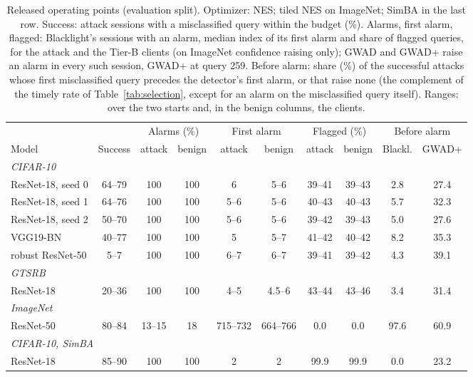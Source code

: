 \begin{table}[!tbp]
\centering\footnotesize\setlength{\tabcolsep}{2.5pt}
\caption{Released operating points (evaluation split). Optimizer: NES; tiled NES on ImageNet; SimBA in the last row. Success: attack sessions with a misclassified query within the budget (\%). Alarms, first alarm, flagged: Blacklight's sessions with an alarm, median index of its first alarm and share of flagged queries, for the attack and the Tier-B clients (on ImageNet confidence raising only); GWAD and GWAD+ raise an alarm in every such session, GWAD+ at query 259. Before alarm: share (\%) of the successful attacks whose first misclassified query precedes the detector's first alarm, or that raise none (the complement of the timely rate of Table~\ref{tab:selection}, except for an alarm on the misclassified query itself). Ranges: over the two starts and, in the benign columns, the clients.}
\label{tab:operating-main}
\vspace{3pt}
\begin{adjustbox}{max width=\textwidth}
\begin{tabular}{lccccccccc}
\toprule
& & \multicolumn{2}{c}{Alarms (\%)} & \multicolumn{2}{c}{First alarm} & \multicolumn{2}{c}{Flagged (\%)} & \multicolumn{2}{c}{Before alarm} \\
\cmidrule(lr){3-4}\cmidrule(lr){5-6}\cmidrule(lr){7-8}\cmidrule(lr){9-10}
Model & Success & attack & benign & attack & benign & attack & benign & Blackl. & GWAD+ \\
\midrule
\multicolumn{10}{l}{\emph{CIFAR-10}} \\
ResNet-18, seed 0 & 64--79 & 100 & 100 & 6 & 5--6 & 39--41 & 39--43 & 2.8 & 27.4 \\
ResNet-18, seed 1 & 64--76 & 100 & 100 & 5--6 & 5--6 & 40--43 & 40--43 & 5.7 & 32.3 \\
ResNet-18, seed 2 & 50--70 & 100 & 100 & 5--6 & 5--6 & 39--42 & 39--43 & 5.0 & 27.6 \\
VGG19-BN & 40--77 & 100 & 100 & 5 & 5--7 & 41--42 & 40--42 & 8.2 & 35.3 \\
robust ResNet-50 & 5--7 & 100 & 100 & 6--7 & 6--7 & 39--41 & 39--42 & 4.3 & 39.1 \\
\multicolumn{10}{l}{\emph{GTSRB}} \\
ResNet-18 & 20--36 & 100 & 100 & 4--5 & 4.5--6 & 43--44 & 43--46 & 3.4 & 31.4 \\
\multicolumn{10}{l}{\emph{ImageNet}} \\
ResNet-50 & 80--84 & 13--15 & 18 & 715--732 & 664--766 & 0.0 & 0.0 & 97.6 & 60.9 \\
\multicolumn{10}{l}{\emph{CIFAR-10, SimBA}} \\
ResNet-18 & 85--90 & 100 & 100 & 2 & 2 & 99.9 & 99.9 & 0.0 & 23.2 \\
\bottomrule
\end{tabular}
\end{adjustbox}
\end{table}
